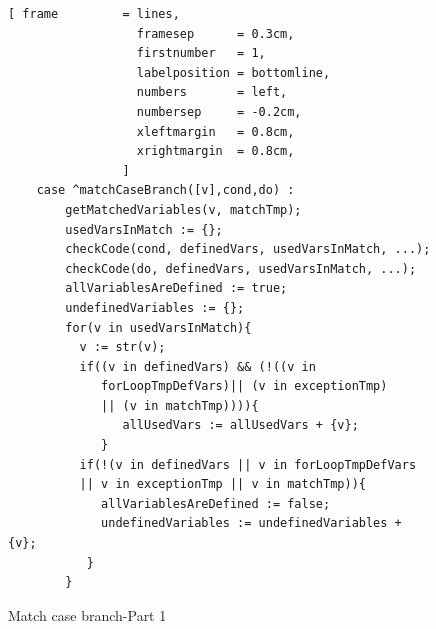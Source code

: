 \documentclass[11pt]{report}
\begin{document}
\begin{figure}[!htb]
\centering
\begin{Verbatim}[ frame         = lines, 
                  framesep      = 0.3cm, 
                  firstnumber   = 1,
                  labelposition = bottomline,
                  numbers       = left,
                  numbersep     = -0.2cm,
                  xleftmargin   = 0.8cm,
                  xrightmargin  = 0.8cm,
                ]
    case ^matchCaseBranch([v],cond,do) : 
		getMatchedVariables(v, matchTmp);
		usedVarsInMatch := {};
		checkCode(cond, definedVars, usedVarsInMatch, ...);
		checkCode(do, definedVars, usedVarsInMatch, ...);
		allVariablesAreDefined := true;
		undefinedVariables := {};
		for(v in usedVarsInMatch){
   		  v := str(v);
   		  if((v in definedVars) && (!((v in 
   		     forLoopTmpDefVars)|| (v in exceptionTmp) 
   		     || (v in matchTmp)))){
      	     	allUsedVars := allUsedVars + {v};
		     }
   		  if(!(v in definedVars || v in forLoopTmpDefVars 
   		  || v in exceptionTmp || v in matchTmp)){
      		 allVariablesAreDefined := false;
      		 undefinedVariables := undefinedVariables + {v};
  		   }
		}
\end{Verbatim}
\vspace*{-0.3cm}
\caption{Match case branch-Part 1}
\label{fig:matchCaseBranch-part1}
\end{figure}
\end{document}
